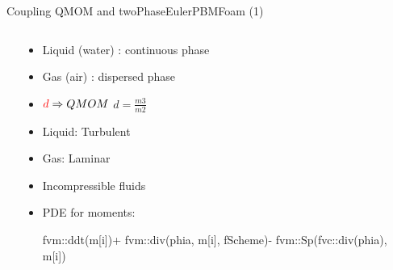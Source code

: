 \documentclass{beamer}
\begin{document}
\begin{frame}{Coupling QMOM and twoPhaseEulerPBMFoam (1)}
\begin{columns}
\begin{column}{0.3\textwidth}
\end{column}  

\begin{column}{0.9\textwidth}

\begin{itemize}

\item Liquid (water) : continuous phase

\item Gas (air) : dispersed phase

\item $\textcolor{red}{d} \Rightarrow QMOM$ $\boxed{d =  \frac{m3}{m2}}$ 

\item Liquid: Turbulent 

\item Gas: Laminar 

\item Incompressible fluids

\item PDE for moments:


          fvm::ddt(m[i])+ fvm::div(phia, m[i], fScheme)- fvm::Sp(fvc::div(phia), m[i])

     

\end{itemize}

\end{column}

\end{columns}

\end{frame}
\end{document}
